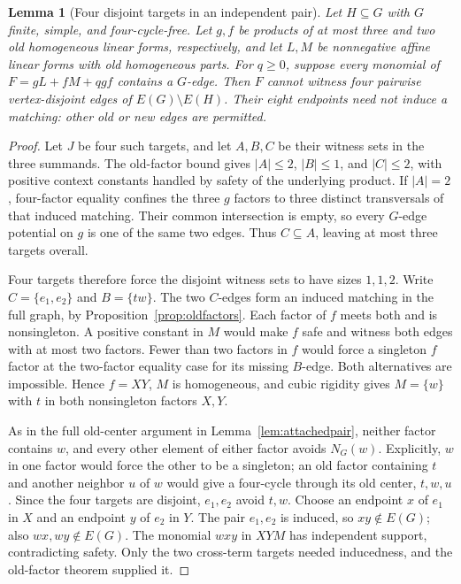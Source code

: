 \documentclass[11pt]{article}
\newtheorem{lemma}[theorem]{Lemma}
\theoremstyle{definition}
\theoremstyle{remark}
\begin{document}
\begin{lemma}[Four disjoint targets in an independent pair]\label{lem:disjointpair}
Let $H\subseteq G$ with $G$ finite, simple, and four-cycle-free. Let $g,f$ be products of at most three and two old homogeneous linear forms, respectively, and let $L,M$ be nonnegative affine linear forms with old homogeneous parts. For $q\geq0$, suppose every monomial of $F=gL+fM+qgf$ contains a $G$-edge. Then $F$ cannot witness four pairwise vertex-disjoint edges of $E(G)\setminus E(H)$. Their eight endpoints need not induce a matching: other old or new edges are permitted.
\end{lemma}
\begin{proof}
Let $J$ be four such targets, and let $A,B,C$ be their witness sets in the three summands. The old-factor bound gives $|A|\leq2$, $|B|\leq1$, and $|C|\leq2$, with positive context constants handled by safety of the underlying product. If $|A|=2$, four-factor equality confines the three $g$ factors to three distinct transversals of that induced matching. Their common intersection is empty, so every $G$-edge potential on $g$ is one of the same two edges. Thus $C\subseteq A$, leaving at most three targets overall.

Four targets therefore force the disjoint witness sets to have sizes $1,1,2$. Write $C=\{e_1,e_2\}$ and $B=\{tw\}$. The two $C$-edges form an induced matching in the full graph, by Proposition~\ref{prop:oldfactors}. Each factor of $f$ meets both and is nonsingleton. A positive constant in $M$ would make $f$ safe and witness both edges with at most two factors. Fewer than two factors in $f$ would force a singleton $f$ factor at the two-factor equality case for its missing $B$-edge. Both alternatives are impossible. Hence $f=XY$, $M$ is homogeneous, and cubic rigidity gives $M=\{w\}$ with $t$ in both nonsingleton factors $X,Y$.

As in the full old-center argument in Lemma~\ref{lem:attachedpair}, neither factor contains $w$, and every other element of either factor avoids $N_G(w)$. Explicitly, $w$ in one factor would force the other to be a singleton; an old factor containing $t$ and another neighbor $u$ of $w$ would give a four-cycle through its old center, $t,w,u$. Since the four targets are disjoint, $e_1,e_2$ avoid $t,w$. Choose an endpoint $x$ of $e_1$ in $X$ and an endpoint $y$ of $e_2$ in $Y$. The pair $e_1,e_2$ is induced, so $xy\notin E(G)$; also $wx,wy\notin E(G)$. The monomial $wxy$ in $XYM$ has independent support, contradicting safety. Only the two cross-term targets needed inducedness, and the old-factor theorem supplied it.
\end{proof}
\end{document}
